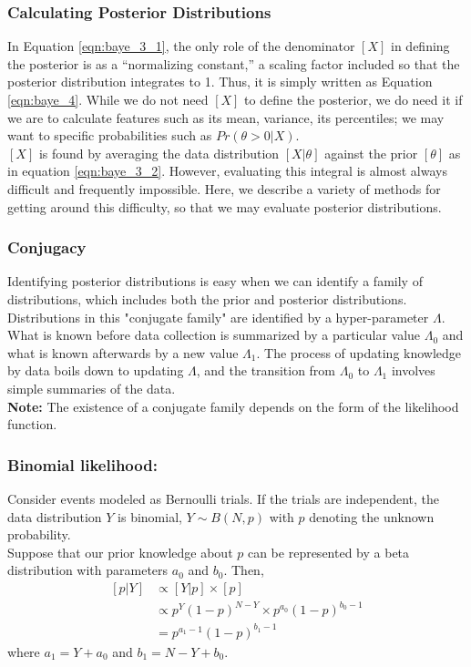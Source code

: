 \documentclass[12pt,oneside,a4paper]{book}
\theoremstyle{definition}
\theoremstyle{remark}
\begin{document}
			\subsubsection{Calculating Posterior Distributions}
				In Equation \eqref{eqn:baye_3_1}, the only role of the denominator $[X]$ in defining the posterior is as a “normalizing constant,” a scaling factor included so that the posterior distribution integrates to 1. Thus, it is simply written as Equation \eqref{eqn:baye_4}. While we do not need $[X]$ to define the posterior, we do need it if we are to calculate features such as its mean, variance, its percentiles; we may want to specific probabilities such as $Pr(\theta >0|X)$.\\

				$[X]$ is found by averaging the data distribution $[X|\theta]$ against the prior $[\theta]$ as in equation \eqref{eqn:baye_3_2}. However, evaluating this integral is almost always difficult and frequently impossible. Here, we describe a variety of methods for getting around this difficulty, so that we may evaluate posterior distributions.

			\subsubsection{Conjugacy}
				Identifying posterior distributions is easy when we can identify a family of distributions, which includes both the prior and posterior distributions. Distributions in this "conjugate family" are identified by a hyper-parameter $\Lambda$.\\
				What is known before data collection is summarized by a particular value $\Lambda_0$ and what is known afterwards by a new value $\Lambda_1$. The process of updating knowledge by data boils down to updating $\Lambda$, and the transition from $\Lambda_0$ to $\Lambda_1$ involves simple summaries of the data.\\
				\textbf{Note:} The existence of a conjugate family depends on the form of the likelihood function.

				\subsubsection{Binomial likelihood:}
					Consider events modeled as Bernoulli trials. If the trials are independent, the data distribution $Y$ is binomial, $Y \sim B(N,p)$ with $p$ denoting the unknown probability.\\
					Suppose that our prior knowledge about $p$ can be represented by a beta distribution with parameters $a_0$ and $b_0$. Then,
					\begin{equation*}
						\begin{aligned}
							[p|Y] &\propto [Y|p]\times[p]\\
							&\propto p^{Y}(1-p)^{N-Y} \times p^{a_0}(1-p)^{b_0-1}\\
							&=p^{a_1-1}(1-p)^{b_1-1}
						\end{aligned}
					\end{equation*}
					where $a_1 = Y+a_0$ and $b_1 = N-Y+b_0$.\\
\end{document}
